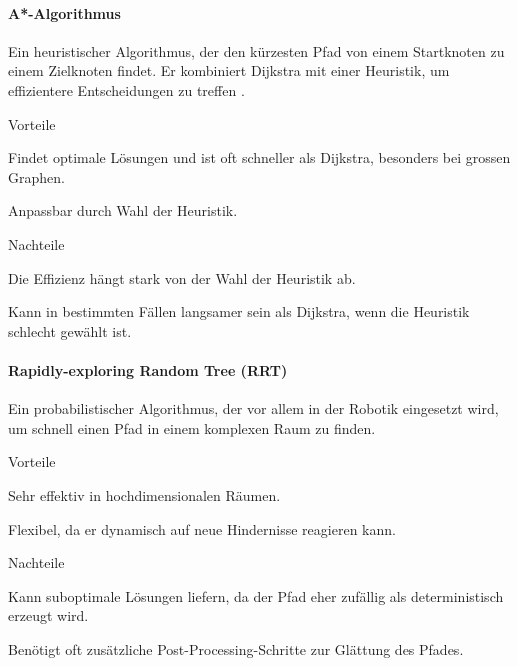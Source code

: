 \documentclass[../main.tex]{subfiles}
\begin{document}
\paragraph{A*-Algorithmus}

Ein heuristischer Algorithmus, der den kürzesten Pfad von einem Startknoten zu einem Zielknoten findet. Er kombiniert Dijkstra mit einer Heuristik, um effizientere Entscheidungen zu treffen \cite{dijkstra_vs_astar}.

\begin{minipage}[t]{0.48\textwidth}
\begin{items}
  \item [Vorteile]
  \item Findet optimale Lösungen und ist oft schneller als Dijkstra, besonders bei grossen Graphen.
  \item Anpassbar durch Wahl der Heuristik.
\end{items}
\end{minipage}
\hfill
\begin{minipage}[t]{0.48\textwidth}
\begin{items}
  \item [Nachteile]
  \item Die Effizienz hängt stark von der Wahl der Heuristik ab.
  \item Kann in bestimmten Fällen langsamer sein als Dijkstra, wenn die Heuristik schlecht gewählt ist.
\end{items}
\end{minipage}

\paragraph{Rapidly-exploring Random Tree (RRT)}

Ein probabilistischer Algorithmus, der vor allem in der Robotik eingesetzt wird,
um schnell einen Pfad in einem komplexen Raum zu finden.

\begin{minipage}[t]{0.48\textwidth}
\begin{items}
  \item [Vorteile]
  \item Sehr effektiv in hochdimensionalen Räumen.
  \item Flexibel, da er dynamisch auf neue Hindernisse reagieren kann.
\end{items}
\end{minipage}
\hfill
\begin{minipage}[t]{0.48\textwidth}
\begin{items}
  \item [Nachteile]
  \item Kann suboptimale Lösungen liefern, da der Pfad eher zufällig als deterministisch erzeugt wird.
  \item Benötigt oft zusätzliche Post-Processing-Schritte zur Glättung des Pfades.
\end{items}
\end{minipage}
\end{document}
